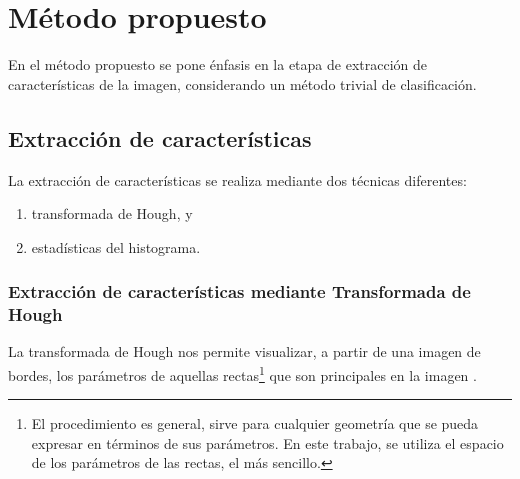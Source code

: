 \documentclass[conference,a4paper,10pt,oneside,final]{tfmpd}
\begin{document}
\section{Método propuesto}
En el método propuesto se pone énfasis en la etapa de
extracción de carac\-te\-rís\-ti\-cas de la imagen, considerando
un método trivial de clasificación.
%
%
\subsection*{Extracción de características}
La extracción de ca\-rac\-te\-rís\-ti\-cas se realiza
mediante dos técnicas diferentes:
\begin{enumerate}
  \item transformada de Hough, y
  \item estadísticas del histograma.
\end{enumerate}

%
%
\subsubsection{Extracción de características mediante Transformada de Hough}
La transformada de Hough nos permite vi\-sua\-li\-zar, a partir de una imagen de
bordes, los parámetros de aquellas rectas\footnote{El procedimiento es general,
sirve para cualquier geometría que se pueda expresar en términos de sus
parámetros. En este trabajo, se utiliza el espacio
de los parámetros de las rectas, el más sencillo.}
que son principales en la imagen \cite{gonzalez+woods}.
\end{document}

